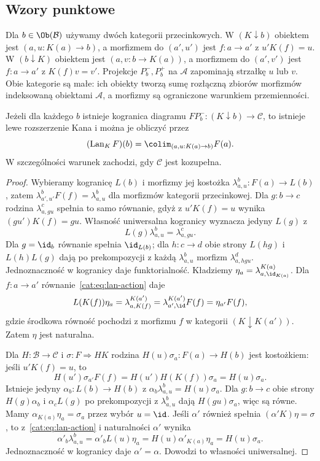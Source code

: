 \subsection{Wzory punktowe}
\begin{definicja}\label{cat:def:kan-comma}
Dla $b\in\Ob(\mathcal B)$ używamy dwóch kategorii przecinkowych. W $(K\downarrow b)$ obiektem jest $(a,u:K(a)\to b)$, a morfizmem do $(a',u')$ jest $f:a\to a'$ z $u'K(f)=u$. W $(b\downarrow K)$ obiektem jest $(a,v:b\to K(a))$, a morfizmem do $(a',v')$ jest $f:a\to a'$ z $K(f)v=v'$. Projekcje $P_b^-,P_b^+$ na $\mathcal A$ zapominają strzałkę $u$ lub $v$. Obie kategorie są małe: ich obiekty tworzą sumę rozłączną zbiorów morfizmów indeksowaną obiektami $\mathcal A$, a morfizmy są ograniczone warunkiem przemienności.
\end{definicja}
\begin{twierdzenie}\label{cat:thm:pointwise-lan}
Jeżeli dla każdego $b$ istnieje kogranica diagramu $FP_b^-:(K\downarrow b)\to\mathcal C$, to istnieje lewe rozszerzenie Kana i można je obliczyć przez
\[
 (\operatorname{Lan}_K F)(b)=\colim_{(a,u:K(a)\to b)} F(a).
\]
W szczególności warunek zachodzi, gdy $\mathcal C$ jest kozupełna.
\end{twierdzenie}
\begin{proof}
Wybieramy kogranicę $L(b)$ i morfizmy jej kostożka $\lambda^b_{a,u}:F(a)\to L(b)$, zatem $\lambda^b_{a',u'}F(f)=\lambda^b_{a,u}$ dla morfizmów kategorii przecinkowej. Dla $g:b\to c$ rodzina $\lambda^c_{a,gu}$ spełnia to samo równanie, gdyż z $u'K(f)=u$ wynika $(gu')K(f)=gu$. Własność uniwersalna kogranicy wyznacza jedyny $L(g)$ z
\begin{equation}\label{cat:eq:lan-action}
 L(g)\lambda^b_{a,u}=\lambda^c_{a,gu}.
\end{equation}
Dla $g=\id_b$ równanie spełnia $\id_{L(b)}$; dla $h:c\to d$ obie strony $L(hg)$ i $L(h)L(g)$ dają po prekompozycji z każdą $\lambda^b_{a,u}$ morfizm $\lambda^d_{a,hgu}$. Jednoznaczność w kogranicy daje funktorialność.
Kładziemy $\eta_a=\lambda^{K(a)}_{a,\id_{K(a)}}$. Dla $f:a\to a'$ równanie~\eqref{cat:eq:lan-action} daje
\[
 L(K(f))\eta_a=\lambda^{K(a')}_{a,K(f)}
 =\lambda^{K(a')}_{a',\id}F(f)=\eta_{a'}F(f),
\]
gdzie środkowa równość pochodzi z morfizmu $f$ w kategorii $(K\downarrow K(a'))$. Zatem $\eta$ jest naturalna.

Dla $H:\mathcal B\to\mathcal C$ i $\sigma:F\Rightarrow HK$ rodzina $H(u)\sigma_a:F(a)\to H(b)$ jest kostożkiem: jeśli $u'K(f)=u$, to
\[
 H(u')\sigma_{a'}F(f)=H(u')H(K(f))\sigma_a=H(u)\sigma_a.
\]
Istnieje jedyny $\alpha_b:L(b)\to H(b)$ z $\alpha_b\lambda^b_{a,u}=H(u)\sigma_a$. Dla $g:b\to c$ obie strony $H(g)\alpha_b$ i $\alpha_c L(g)$ po prekompozycji z $\lambda^b_{a,u}$ dają $H(gu)\sigma_a$, więc są równe. Mamy $\alpha_{K(a)}\eta_a=\sigma_a$ przez wybór $u=\id$. Jeśli $\alpha'$ również spełnia $(\alpha' K)\eta=\sigma$, to z~\eqref{cat:eq:lan-action} i naturalności $\alpha'$ wynika
\[
 \alpha'_b\lambda^b_{a,u}=\alpha'_b L(u)\eta_a
 =H(u)\alpha'_{K(a)}\eta_a=H(u)\sigma_a.
\]
Jednoznaczność w kogranicy daje $\alpha'=\alpha$. Dowodzi to własności uniwersalnej.
\end{proof}
